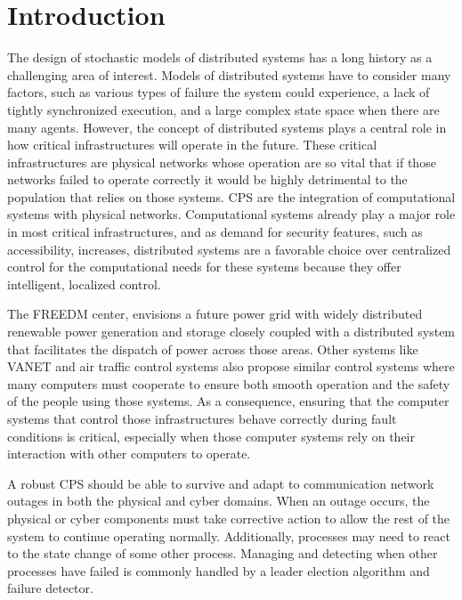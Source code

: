 \chapter{Introduction}

The design of stochastic models of distributed systems has a long history as a challenging area of interest.
Models of distributed systems have to consider many factors, such as various types of failure the system could experience, a lack of tightly synchronized execution, and a large complex state space when there are many agents\cite{DISTRIBUTED}\cite{distributed-challenges}. 
However, the concept of distributed systems plays a central role in how critical infrastructures will operate in the future.
These critical infrastructures are physical networks whose operation are so vital that if those networks failed to operate correctly it would be highly detrimental to the population that relies on those systems.
\ac{CPS} are the integration of computational systems with physical networks.
Computational systems already play a major role in most critical infrastructures, and as demand for security features, such as accessibility, increases, distributed systems are a favorable choice over centralized control for the computational needs for these systems because they offer intelligent, localized control\cite{SMARTGRIDBENEFITS}.

The \ac{FREEDM} center\cite{FREEDM}, envisions a future power grid with widely distributed renewable power generation and storage closely coupled with a distributed system that facilitates the dispatch of power across those areas.
Other systems like \ac{VANET}\cite{CARS1}\cite{CARS2}\cite{vanet-congestion} and air traffic control systems\cite{AIRTRAFFIC1}\cite{AIRTRAFFIC2} also propose similar control systems where many computers must cooperate to ensure both smooth operation and the safety of the people using those systems.
As a consequence, ensuring that the computer systems that control those infrastructures behave correctly during fault conditions is critical, especially when those computer systems rely on their interaction with other computers to operate.

A robust \ac{CPS} should be able to survive and adapt to communication network outages in both the physical and cyber domains.
When an outage occurs, the physical or cyber components must take corrective action to allow the rest of the system to continue operating normally.
Additionally, processes may need to react to the state change of some other process.
Managing and detecting when other processes have failed is commonly handled by a leader election algorithm and failure detector.

